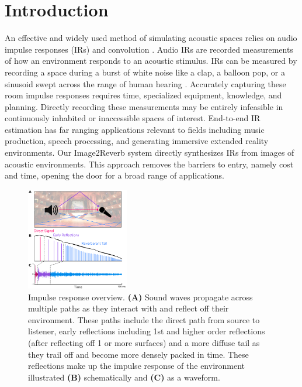 \documentclass[10pt,twocolumn,letterpaper]{article}
\begin{document}
\section{Introduction}
\label{introduction}
An effective and widely used method of simulating acoustic spaces relies on audio impulse responses (IRs) and convolution \cite{valimaki2012fifty, robjohns1999sony}. Audio IRs are recorded measurements of how an environment responds to an acoustic stimulus. IRs can be measured by recording a space during a burst of white noise like a clap, a balloon pop, or a sinusoid swept across the range of human hearing \cite{reilly1995convolution}. Accurately capturing these room impulse responses requires time, specialized equipment, knowledge, and planning. Directly recording these measurements may be entirely infeasible in continuously inhabited or inaccessible spaces of interest. End-to-end IR estimation has far ranging applications relevant to fields including music production, speech processing, and generating immersive extended reality environments. Our Image2Reverb system directly synthesizes IRs from images of acoustic environments. This approach removes the barriers to entry, namely cost and time, opening the door for a broad range of applications.

\begin{figure}[ht]
    \centering
    \includegraphics[width=0.4\textwidth]{ir_explanatory.png}
    \caption{Impulse response overview. \textbf{(A)} Sound waves propagate across multiple paths as they interact with and reflect off their environment. These paths include the direct path from source to listener, early reflections including 1st and higher order reflections (after reflecting off 1 or more surfaces) and a more diffuse tail as they trail off and become more densely packed in time. These reflections make up the impulse response of the environment illustrated \textbf{(B)} schematically and \textbf{(C)} as a waveform.}
    \label{fig:ir_explanatory}
\end{figure}
\end{document}

